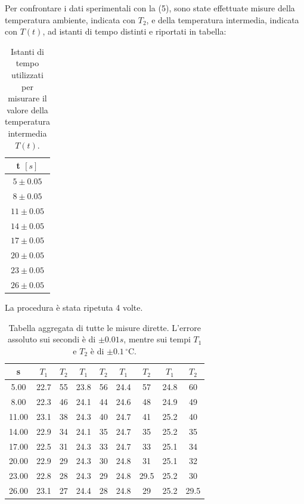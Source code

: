 

Per confrontare i dati sperimentali con la (5), sono state effettuate misure della temperatura ambiente, indicata con $T_2$, e della temperatura intermedia, indicata con $T(t)$, ad istanti di tempo distinti e riportati in tabella:

\begin{table}[H]
	\centering
	\begin{tabular}{|c|}
		\hline
		\textbf{t $[s]$} \\
		\hline
		$5\pm 0.05$ \\
		$8\pm 0.05$ \\
		$11\pm 0.05$ \\
		$14\pm 0.05$ \\
		$17\pm 0.05$ \\
            $20\pm 0.05$ \\
            $23\pm 0.05$ \\
            $26\pm 0.05$ \\
		\hline
	\end{tabular}
	\caption{Istanti di tempo utilizzati per misurare il valore della           temperatura intermedia $T(t)$.}
	\label{tab:}
\end{table}
La procedura è stata ripetuta 4 volte.
\begin{table}[H]
\centering
\begin{tabular}{|c|c|c|c|c|c|c|c|c|}
\hline
\textbf{s} & \textbf{$T_1$} & \textbf{$T_2$} & \textbf{$T_1$} & \textbf{$T_2$} & \textbf{$T_1$} & \textbf{$T_2$} & \textbf{$T_1$} & \textbf{$T_2$} \\
\hline
5.00 & 22.7 & 55 & 23.8 & 56 & 24.4 & 57 & 24.8 & 60 \\
8.00 & 22.3 & 46 & 24.1 & 44 & 24.6 & 48 & 24.9 & 49 \\
11.00 & 23.1 & 38 & 24.3 & 40 & 24.7 & 41 & 25.2 & 40 \\
14.00 & 22.9 & 34 & 24.1 & 35 & 24.7 & 35 & 25.2 & 35 \\
17.00 & 22.5 & 31 & 24.3 & 33 & 24.7 & 33 & 25.1 & 34 \\
20.00 & 22.9 & 29 & 24.3 & 30 & 24.8 & 31 & 25.1 & 32 \\
23.00 & 22.8 & 28 & 24.3 & 29 & 24.8 & 29.5 & 25.2 & 30 \\
26.00 & 23.1 & 27 & 24.4 & 28 & 24.8 & 29 & 25.2 & 29.5 \\
\hline
\end{tabular}
\caption{Tabella aggregata di tutte le misure dirette. L'errore assoluto sui secondi è di $\pm 0.01s$, mentre sui tempi $T_1$ e $T_2$ è di $\pm 0.1\,^\circ\mathrm{C}$.}
\label{tab:esempio}
\end{table}
